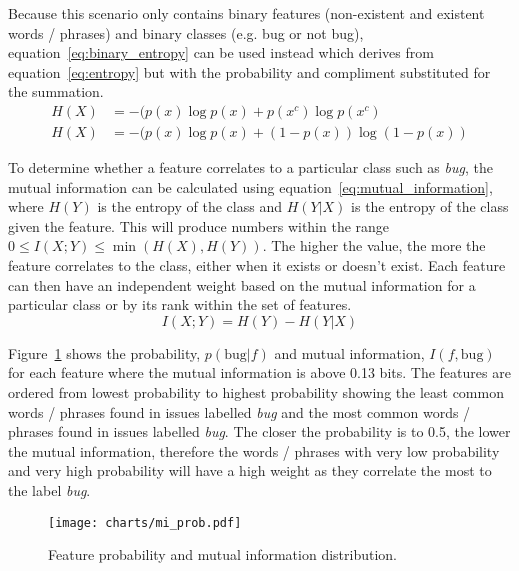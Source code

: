 Because this scenario only contains binary features (non-existent and existent words / phrases) and binary classes
(e.g. bug or not bug), equation~\ref{eq:binary_entropy} can be used instead which derives from equation~\ref{eq:entropy} but
with the probability and compliment substituted for the summation.
\begin{equation}
	\label{eq:binary_entropy}
	\begin{split}
		H(X) &= -(p(x) \log p(x) + p(x^c)     \log p(x^c)    \\
		H(X) &= -(p(x) \log p(x) + (1 - p(x)) \log(1 - p(x))
	\end{split}
\end{equation}

To determine whether a feature correlates to a particular class such as \textit{bug}, the mutual information can be calculated
using equation~\ref{eq:mutual_information}, where $H(Y)$ is the entropy of the class and $H(Y|X)$ is the entropy of the class
given the feature. This will produce numbers within the range $0 \leq I(X;Y) \leq \min(H(X), H(Y))$. The higher the value, the
more the feature correlates to the class, either when it exists or doesn't exist. Each feature can then have an independent
weight based on the mutual information for a particular class or by its rank within the set of features.
\begin{equation}
	\label{eq:mutual_information}
	I(X;Y) = H(Y) - H(Y|X)
\end{equation}

Figure~\ref{fig:mi_prob} shows the probability, $p(\mathrm{bug}|f)$ and mutual information, $I(f,\mathrm{bug})$ for each feature
where the mutual information is above 0.13 bits. The features are ordered from lowest probability to highest probability showing
the least common words / phrases found in issues labelled \textit{bug} and the most common words / phrases found in issues
labelled \textit{bug}. The closer the probability is to 0.5, the lower the mutual information, therefore the words / phrases
with very low probability and very high probability will have a high weight as they correlate the most to the label
\textit{bug}.
\begin{figure}[h]
	\centering
	\texttt{[image: charts/mi\_prob.pdf]}
	\label{fig:mi_prob}
	\caption{Feature probability and mutual information distribution.}
\end{figure}

